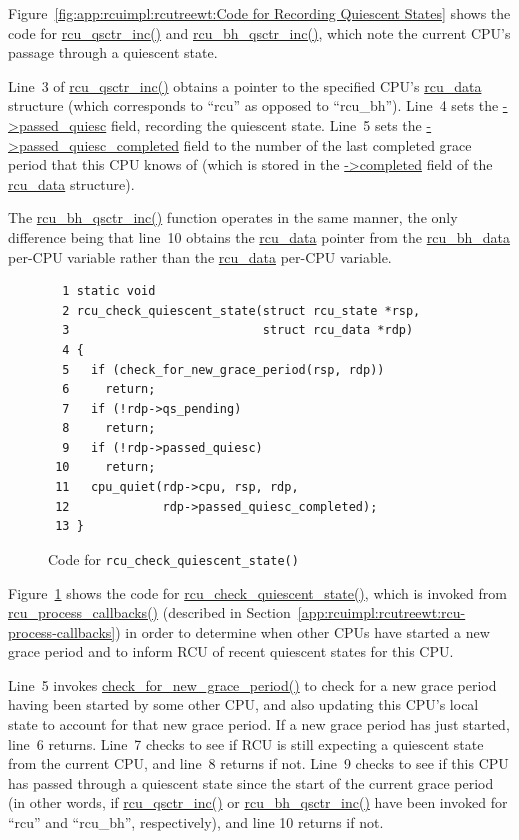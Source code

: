 Figure~\ref{fig:app:rcuimpl:rcutreewt:Code for Recording Quiescent States}
shows the code for \url{rcu_qsctr_inc()} and \url{rcu_bh_qsctr_inc()},
which note the current CPU's passage through a quiescent state.

Line~3 of \url{rcu_qsctr_inc()} obtains a pointer to the specified
CPU's \url{rcu_data} structure (which corresponds to ``rcu'' as opposed
to ``rcu\_bh'').
Line~4 sets the \url{->passed_quiesc} field, recording the
quiescent state.
Line~5 sets the \url{->passed_quiesc_completed} field to the number
of the last completed grace period that this CPU knows of (which is
stored in the \url{->completed} field of the \url{rcu_data}
structure).

The \url{rcu_bh_qsctr_inc()} function operates in the same manner,
the only difference being that line~10 obtains the \url{rcu_data}
pointer from the \url{rcu_bh_data} per-CPU variable rather than
the \url{rcu_data} per-CPU variable.

\begin{figure}[tbp]
{ \scriptsize
\begin{verbatim}
  1 static void
  2 rcu_check_quiescent_state(struct rcu_state *rsp,
  3                           struct rcu_data *rdp)
  4 {
  5   if (check_for_new_grace_period(rsp, rdp))
  6     return;
  7   if (!rdp->qs_pending)
  8     return;
  9   if (!rdp->passed_quiesc)
 10     return;
 11   cpu_quiet(rdp->cpu, rsp, rdp,
 12             rdp->passed_quiesc_completed);
 13 }
\end{verbatim}
}
\caption{Code for {\tt rcu\_check\_quiescent\_state()}}
\label{fig:app:rcuimpl:rcutreewt:Code for rcu-check-quiescent-state}
\end{figure}

Figure~\ref{fig:app:rcuimpl:rcutreewt:Code for rcu-check-quiescent-state}
shows the code for \url{rcu_check_quiescent_state()}, which is invoked
from \url{rcu_process_callbacks()}
(described in Section~\ref{app:rcuimpl:rcutreewt:rcu-process-callbacks})
in order to determine when other CPUs have started a new grace period
and to inform RCU of recent quiescent states for this CPU.

Line~5 invokes \url{check_for_new_grace_period()} to check for
a new grace period having been started by some other CPU, and also
updating this CPU's local state to account for that new grace period.
If a new grace period has just started, line~6 returns.
Line~7 checks to see if RCU is still expecting a quiescent state from
the current CPU, and line~8 returns if not.
Line~9 checks to see if this CPU has passed through a quiescent state
since the start of the current grace period (in other words, if
\url{rcu_qsctr_inc()} or \url{rcu_bh_qsctr_inc()} have been invoked
for ``rcu'' and ``rcu\_bh'', respectively), and line 10 returns if not.

